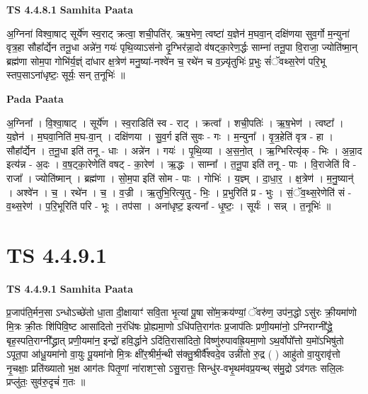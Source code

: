 \documentclass[17pt]{extarticle}
\begin{document}
\textbf{TS 4.4.8.1 } \newline
\textbf{Samhita Paata} \newline

अ॒ग्निना॑ विश्वा॒षाट् सूर्ये॑ण स्व॒राट् क्रत्वा॒ शची॒पति॑र्. ऋष॒भेण॒ त्वष्टा॑ य॒ज्ञेन॑ म॒घवा॒न् दक्षि॑णया सुव॒र्गो म॒न्युना॑ वृत्र॒हा सौहा᳚र्द्येन तनू॒धा अन्ने॑न॒ गयः॑ पृथि॒व्याऽस॑नो दृ॒ग्भिर॑न्ना॒दो व॑षट्का॒रेण॒र्द्धः साम्ना॑ तनू॒पा वि॒राजा॒ ज्योति॑ष्मा॒न् ब्रह्म॑णा सोम॒पा गोभि॑र्य॒ज्ञ्ं दा॑धार क्ष॒त्रेण॑ मनु॒ष्या॑-नश्वे॑न च॒ रथे॑न च व॒ज्र्यृ॑तुभिः॑ प्र॒भुः सं॑ॅवथ्स॒रेण॑ परि॒भू स्तप॒साऽना॑धृष्टः॒ सूर्यः॒ सन् त॒नूभिः॑ ॥ \newline

\textbf{Pada Paata} \newline

अ॒ग्निना᳚ । वि॒श्वा॒षाट् । सूर्ये॑ण । स्व॒राडिति॑ स्व - राट् । क्रत्वा᳚ । शची॒पतिः॑ । ऋ॒ष॒भेण॑ । त्वष्टा᳚ । य॒ज्ञेन॑ । म॒घवा॒निति॑ म॒घ-वा॒न् । दक्षि॑णया । सु॒व॒र्ग इति॑ सुवः - गः । म॒न्युना᳚ । वृ॒त्र॒हेति॑ वृत्र - हा । सौहा᳚र्द्येन । त॒नू॒धा इति॑ तनू - धाः । अन्ने॑न । गयः॑ । पृ॒थि॒व्या । अ॒स॒नो॒त् । ऋ॒ग्भिरित्यृ॑क् - भिः । अ॒न्ना॒द इत्य॑न्न - अ॒दः । व॒ष॒ट्का॒रेणेति॑ वषट् - का॒रेण॑ । ऋ॒द्धः । साम्ना᳚ । त॒नू॒पा इति॑ तनू - पाः । वि॒राजेति॑ वि - राजा᳚ । ज्योति॑ष्मान् । ब्रह्म॑णा । सो॒म॒पा इति॑ सोम - पाः । गोभिः॑ । य॒ज्ञ्म् । दा॒धा॒र॒ । क्ष॒त्रेण॑ । म॒नु॒ष्यान्॑ । अश्वे॑न । च॒ । रथे॑न । च॒ । व॒ज्री । ऋ॒तुभि॒रित्यृ॒तु - भिः॒ । प्र॒भुरिति॑ प्र - भुः । सं॒ॅव॒थ्स॒रेणेति॑ सं - व॒थ्स॒रेण॑ । प॒रि॒भूरिति॑ परि - भूः । तप॑सा । अना॑धृष्ट॒ इत्यना᳚ - धृ॒ष्टः॒ । सूर्यः॑ । सन्न् । त॒नूभिः॑ ॥  \newline





\section{ TS 4.4.9.1 }

\textbf{TS 4.4.9.1 } \newline
\textbf{Samhita Paata} \newline

प्र॒जाप॑ति॒र्मन॒सा ऽन्धोऽच्छे॑तो धा॒ता दी॒क्षायाꣳ॑ सवि॒ता भृ॒त्यां पू॒षा सो॑म॒क्रय॑ण्यां॒ ॅवरु॑ण॒ उप॑न॒द्धो ऽसु॑रः क्री॒यमा॑णो मि॒त्रः क्री॒तः शि॑पिवि॒ष्ट आसा॑दितो न॒रंधि॑षः प्रो॒ह्यमा॒णो ऽधि॑पति॒राग॑तः प्र॒जाप॑तिः प्रणी॒यमा॑नो॒ ऽग्निराग्नी᳚द्ध्रे॒ बृह॒स्पति॒राग्नी᳚द्ध्रात् प्रणी॒यमा॑न॒ इन्द्रो॑ हवि॒र्द्धाने ऽदि॑ति॒रासा॑दितो॒ विष्णु॑रुपावह्रि॒यमा॒णो ऽथ॒र्वोपो᳚त्तो य॒मो॑ऽभिषु॑तो ऽपूत॒पा आ॑धू॒यमा॑नो वा॒युः पू॒यमा॑नो मि॒त्रः क्षी॑र॒श्रीर्म॒न्थी स॑क्तु॒श्रीर्वै᳚श्वदे॒व उन्नी॑तो रु॒द्र ( ) आहु॑तो वा॒युरावृ॑त्तो नृ॒चक्षाः॒ प्रति॑ख्यातो भ॒क्ष आग॑तः पितृ॒णां ना॑राशꣳ॒॒सो ऽसु॒रात्तः॒ सिन्धु॑र-वभृ॒थम॑वप्र॒यन्थ् स॑मु॒द्रो ऽव॑गतः सलि॒लः प्रप्लु॑तः॒ सुव॑रु॒दृचं॑ ग॒तः ॥ \newline
\end{document}
